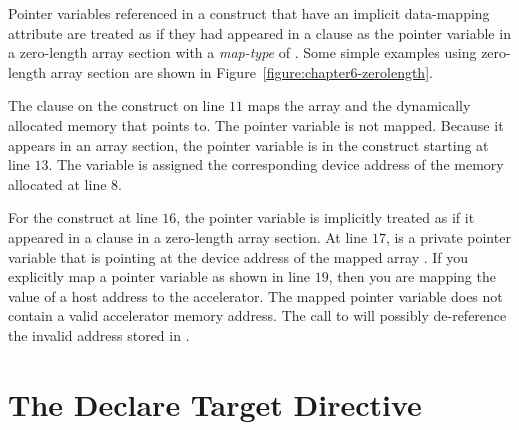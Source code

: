 
Pointer variables referenced in a  construct that have an implicit
data-mapping attribute are treated as if they had appeared in a 
clause as the pointer variable in a zero-length array section with a
\emph{map-type} of .  Some simple examples using zero-length array
section are shown in Figure~\ref{figure:chapter6-zerolength}.

The  clause on the  construct on line $11$ maps the
array  and the dynamically allocated memory that  points to.  The pointer
variable  is not mapped.  Because it appears in an array section, the
pointer variable  is  in the  construct starting at line
$13$.  The  variable  is assigned the corresponding device address of
the memory allocated at line $8$.


For the  construct at line $16$, the pointer variable  is
implicitly treated as if it appeared in a  clause in a zero-length
array section.  At line $17$,  is a private pointer variable that is pointing
at the device address of the mapped array .  If you explicitly map a pointer
variable as shown in line $19$, then you are mapping the value of a host
address to the accelerator.  The mapped pointer variable does not contain a
valid accelerator memory address.  The call to  will possibly de-reference
the invalid address stored in .

\section{The Declare Target Directive}
\label{sec:06.declare-target-construct}

